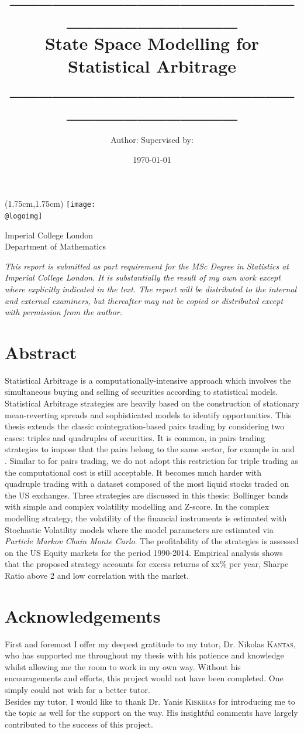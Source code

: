 \documentclass[11pt,a4,twosided,singlespacing,titlepagenumber=on]{scrreprt}
\title{\_\_\_\_\_\_\_\_\_\_\_\_\_\_\_\_\_\_\_\_\_\_\_\_\_\_\_\_\_\_\_\_ \\ State Space Modelling for Statistical Arbitrage \\ \_\_\_\_\_\_\_\_\_\_\_\_\_\_\_\_\_\_\_\_\_\_\_\_\_\_\_\_\_\_\_\_ }
\author{Author: \hfill Supervised by:}
\date{\today}
\makeatletter
\numberwithin{equation}{chapter} %
\theoremstyle{remark}
\renewcommand{\maketitle}{
\begin{titlepage}
\ifdefined\@logoimg
\begin{textblock*}{8cm}(1.75cm,1.75cm)
\texttt{[image: \\@logoimg]}
\end{textblock*}
\vspace*{1cm}

\vspace*{1cm}


\else
\fi
\begin{center}
\vspace*{\stretch{0.1}}
Imperial College London\\
Department of Mathematics\par
\vspace*{\stretch{1}} %
{\titlefont\Huge \@title\par} %
\vspace*{\stretch{2}}
{\large \textit{\@author} \par}
\vspace*{\stretch{0.1}}
{\large \@supervisor \par}
\vspace*{\stretch{3}}
\@date
\vspace*{\stretch{1}}

\end{center}%
\textit{
This report is submitted as part requirement for the MSc Degree in Statistics at Imperial College London. It is substantially the result of my own work except where explicitly indicated in the text. The report will be distributed to the internal and external examiners, but thereafter may not be copied or distributed except with permission from the author.}
\vspace*{\stretch{0.1}}
\end{titlepage}%
}
\makeatother
\begin{document}


\maketitle

\section*{Abstract}
Statistical Arbitrage is a computationally-intensive approach which involves the simultaneous buying and selling of securities according to statistical models. Statistical Arbitrage strategies are heavily based on the construction of stationary mean-reverting spreads and sophisticated models to identify opportunities. This thesis extends the classic cointegration-based pairs trading by considering two cases: triples and quadruples of securities. It is common, in pairs trading strategies to impose that the pairs belong to the same sector, for example in \cite{chan2009} and \cite{dunis2010}. Similar to \cite{caldeira2013} for pairs trading, we do not adopt this restriction for triple trading as the computational cost is still acceptable. It becomes much harder with quadruple trading with a dataset composed of the most liquid stocks traded on the US exchanges. Three strategies are discussed in this thesis: Bollinger bands with simple and complex volatility modelling and Z-score. In the complex modelling strategy, the volatility of the financial instruments is estimated with Stochastic Volatility models where the model parameters are estimated via \textit{Particle Markov Chain Monte Carlo}. The profitability of the strategies is assessed on the US Equity markets for the period 1990-2014. Empirical analysis shows that the proposed strategy accounts for excess returns of xx\% per year, Sharpe Ratio above 2 and low correlation with the market.

\section*{Acknowledgements}
First and foremost I offer my deepest gratitude to my tutor, Dr. Nikolas \textsc{Kantas}, who has supported me throughout my thesis with his patience and knowledge whilst allowing me the room to work in my own way. Without his encouragements and efforts, this project would not have been completed. One simply could not wish for a better tutor. \\

Besides my tutor, I would like to thank Dr. Yanis \textsc{Kiskiras} for introducing me to the topic as well for the support on the way. His insightful comments have largely contributed to the success of this project. \\
\end{document}

